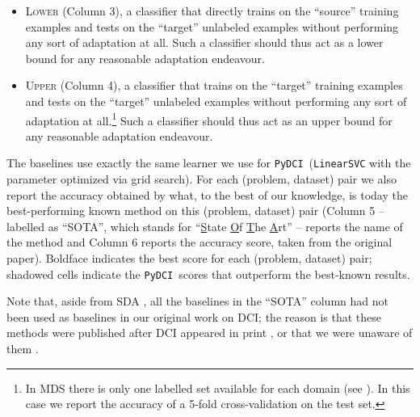 \documentclass{article}
\newcommand{\pydci}{\texttt{PyDCI}}
\begin{document}
\begin{itemize}

\item \textsc{Lower} (Column 3), a classifier that directly trains on
  the ``source'' training examples and tests on the ``target''
  unlabeled examples without performing any sort of adaptation at
  all. Such a classifier should thus act as a lower bound for any
  reasonable adaptation endeavour.

\item \textsc{Upper} (Column 4), a classifier that trains on the
  ``target'' training examples and tests on the ``target'' unlabeled
  examples without performing any sort of adaptation at
  all.\footnote{In MDS there is only one labelled set available for
  each domain (see \citep{Blitzer:2007gf}). In this case we report the
  accuracy of a 5-fold cross-validation on the test set.} Such a
  classifier should thus act as an upper bound for any reasonable
  adaptation endeavour.

\end{itemize}

\noindent The baselines use exactly the same learner we use for
\pydci\ (\texttt{LinearSVC} with the  parameter optimized via grid
search). For each (problem, dataset) pair we also report the accuracy
obtained by what, to the best of our knowledge, is today the
best-performing known method on this (problem, dataset) pair (Column 5
-- labelled as ``SOTA'', which stands for ``\underline{S}tate
\underline{O}f \underline{T}he \underline{A}rt'' -- reports the name
of the method and Column 6 reports the accuracy score, taken from the
original paper).  Boldface indicates the best score for each (problem,
dataset) pair; shadowed cells indicate the \pydci\ scores that
outperform the best-known results.

Note that, aside from SDA \citep{glorot2011domain}, all the baselines
in the ``SOTA'' column had not been used as baselines in our original
work on DCI; the reason is that these methods were published after DCI
appeared in print
\citep{ganin2016domain,Li:2017kg,xu2017cross,zhou2016cross}, or that
we were unaware of them \citep{Yang:2015nb}.
\end{document}
